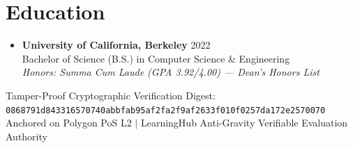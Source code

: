 \documentclass[letterpaper,10pt]{article}
\begin{document}
\section{Education}
\begin{itemize}[leftmargin=0.15in, label={}]
  \item
    \textbf{University of California, Berkeley} \hfill \small{2022} \\
    \small{Bachelor of Science (B.S.) in Computer Science \& Engineering}
    \\ \small{\textit{Honors: Summa Cum Laude (GPA 3.92/4.00) — Dean’s Honors List}}
\end{itemize}

\vfill
\begin{center}
  \footnotesize{\color{gray} Tamper-Proof Cryptographic Verification Digest: \texttt{0868791d843316570740abbfab95af2fa2f9af2633f010f0257da172e2570070}} \\
  \footnotesize{\color{gray} Anchored on Polygon PoS L2 $|$ LearningHub Anti-Gravity Verifiable Evaluation Authority}
\end{center}
\end{document}
